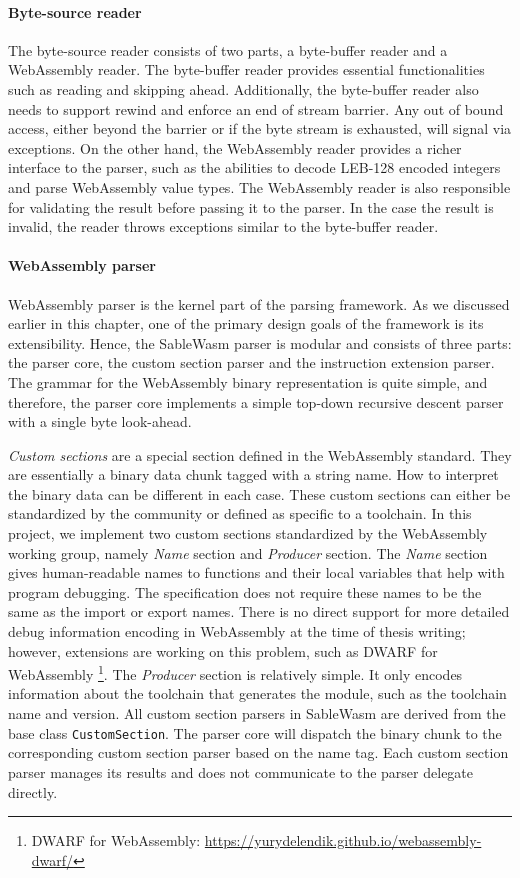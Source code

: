 \paragraph{Byte-source reader}
The byte-source reader consists of two parts, a byte-buffer reader and a
WebAssembly reader. The byte-buffer reader provides essential functionalities
such as reading and skipping ahead. Additionally, the byte-buffer reader also
needs to support rewind and enforce an end of stream barrier. Any out of bound
access, either beyond the barrier or if the byte stream is exhausted, will
signal via exceptions. On the other hand, the WebAssembly reader provides a
richer interface to the parser, such as the abilities to decode LEB-128 encoded
integers and parse WebAssembly value types. The WebAssembly reader is also
responsible for validating the result before passing it to the parser. In the
case the result is invalid, the reader throws exceptions similar to the
byte-buffer reader.

\paragraph{WebAssembly parser}
WebAssembly parser is the kernel part of the parsing framework. As we discussed
earlier in this chapter, one of the primary design goals of the framework is its
extensibility. Hence, the SableWasm parser is modular and consists of three
parts: the parser core, the custom section parser and the instruction extension
parser. The grammar for the WebAssembly binary representation is quite simple,
and therefore, the parser core implements a simple top-down recursive descent
parser with a single byte look-ahead.

\emph{Custom sections} are a special section defined in the WebAssembly
standard. They are essentially a binary data chunk tagged with a string name.
How to interpret the binary data can be different in each case. These custom
sections can either be standardized by the community or defined as specific to a
toolchain. In this project, we implement two custom sections standardized by the
WebAssembly working group, namely \emph{Name} section and \emph{Producer}
section. The \emph{Name} section gives human-readable names to functions and
their local variables that help with program debugging. The specification does
not require these names to be the same as the import or export names. There is
no direct support for more detailed debug information encoding in WebAssembly at
the time of thesis writing; however, extensions are working on this problem,
such as DWARF for WebAssembly \footnote{DWARF for WebAssembly:
  \url{https://yurydelendik.github.io/webassembly-dwarf/}}. The \emph{Producer}
section is relatively simple. It only encodes information about the toolchain
that generates the module, such as the toolchain name and version. All custom
section parsers in SableWasm are derived from the base class
\texttt{CustomSection}. The parser core will dispatch the binary chunk to the
corresponding custom section parser based on the name tag. Each custom section
parser manages its results and does not communicate to the parser delegate
directly.

